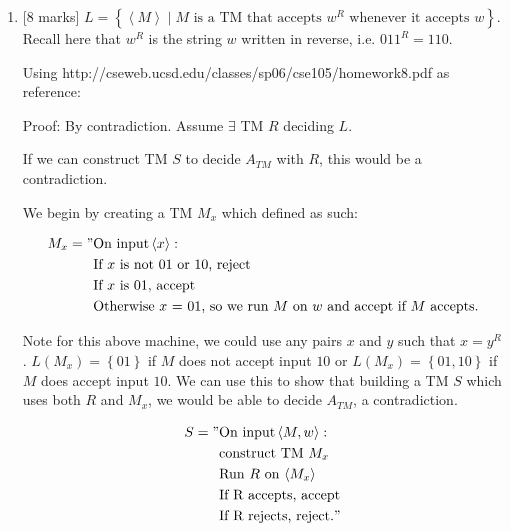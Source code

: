 \documentclass{article}
\newcommand{\set}[1]{{\left\{#1\right\}}}    %
\newcommand{\enc}[1]{\left<#1\right>}
\begin{document}
\begin{enumerate}
\begin{enumerate}
        	\item {[8 marks]} $L=\set{\enc{M}\mid M\text{ is a TM that accepts }w^R\text{ whenever it accepts }w}$. Recall here that $w^R$ is the string $w$ written in reverse, i.e. $011^R=110$.

            Using http://cseweb.ucsd.edu/classes/sp06/cse105/homework8.pdf as reference:

            Proof: By contradiction. Assume $\exists$ TM $R$ deciding $L$.

                    If we can construct TM $S$ to decide $A_{TM}$ with $R$, this would be a contradiction.

                    We begin by creating a TM $M_x$ which defined as such:

                    \begin{equation}
                        \begin{split}
                           M_x = "& \text{On input} \enc{x}: \\
                                  & \text{If $x$ is not $01$ or $10$, reject} \\
                                  & \text{If $x$ is $01$, accept} \\
                                  & \text{Otherwise $x$ = $01$, so we run $M$ on $w$ and accept if $M$ accepts.} \\
                        \end{split}
                    \end{equation}

                    Note for this above machine, we could use any pairs $x$ and $y$ such that $x = y^R$. $L(M_x) = \set{01}$ if $M$ does not accept input $10$ or $L(M_x) = \set{01,10}$ if $M$ does accept input $10$. We can use this to show that building a TM $S$ which uses both $R$ and $M_x$, we would be able to decide $A_{TM}$, a contradiction.

                    \begin{equation}
                        \begin{split}
                           S = "& \text{On input} \enc{M,w}: \\
                                & \text{construct TM } M_x \\
                                & \text{Run $R$ on $\enc{M_x}$} \\
                                & \text{If R accepts, accept} \\
                                & \text{If R rejects, reject.}"
                        \end{split}
                    \end{equation}


\end{enumerate}
\end{enumerate}
\end{document}
